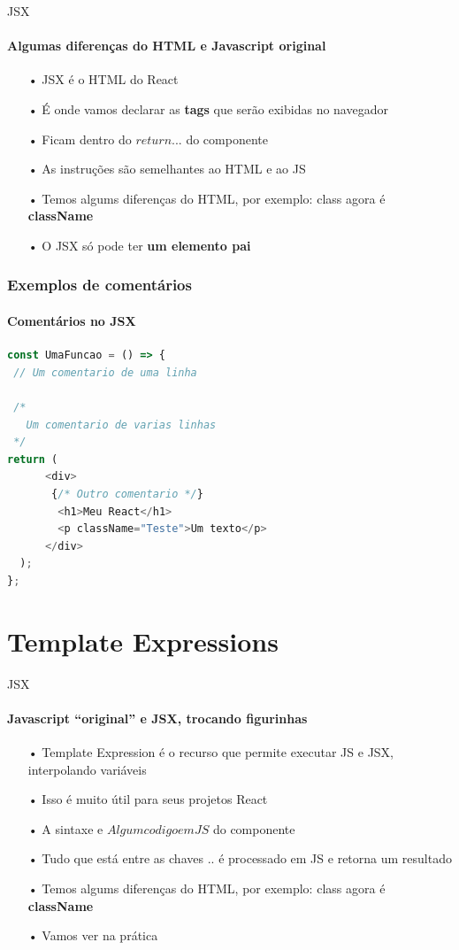 \documentclass[13pt, xcolor={dvipsnames,svgnames}, portuguese]{beamer}
\begin{document}
\begin{frame}{JSX}
\framesubtitle{Algumas diferenças do HTML e Javascript original}
\begin{itemize}
	\item[•] JSX é o HTML do React
	\pause
	\item[•] É onde vamos declarar as \textbf{tags} que serão exibidas no navegador
	\pause
	\item[•] Ficam dentro do $return {  ... }$ do componente
	\pause
	\item[•] As instruções são semelhantes ao HTML e ao JS
	\pause
	\item[•] Temos algums diferenças do HTML, por exemplo: class agora é \textbf{className}
	\item[•] O JSX só pode ter \textbf{um elemento pai}
	
\end{itemize}
\end{frame}


%
\begin{frame}[fragile]
\frametitle{Exemplos de comentários}
\framesubtitle{Comentários no JSX}

\begin{lstlisting}[language=JavaScript]
const UmaFuncao = () => {
 // Um comentario de uma linha
 
 /*
   Um comentario de varias linhas
 */
return (
      <div>
       {/* Outro comentario */}
        <h1>Meu React</h1>
        <p className="Teste">Um texto</p>
      </div>
  );
};
\end{lstlisting}
\end{frame}

\section{Template Expressions}
\begin{frame}{JSX}
\framesubtitle{Javascript ``original'' e JSX, trocando figurinhas}
\begin{itemize}
	\item[•] Template Expression é o recurso que permite executar JS e JSX, interpolando variáveis
	\pause
	\item[•] Isso é muito útil para seus projetos React
	\pause
	\item[•] A sintaxe e ${Algum codigo em JS }$ do componente
	\pause
	\item[•] Tudo que está entre as chaves ${..}$ é processado em JS e retorna um resultado
	\pause
	\item[•] Temos algums diferenças do HTML, por exemplo: class agora é \textbf{className}
	\item[•] Vamos ver na prática
\end{itemize}
\end{frame}
\end{document}
